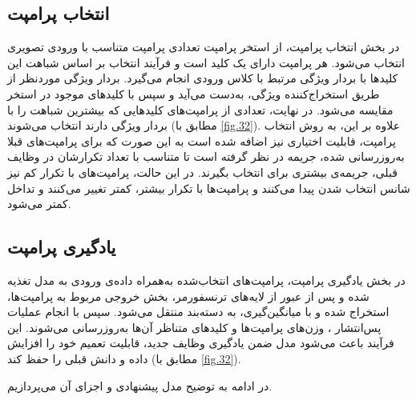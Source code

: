 \subsection{انتخاب پرامپت}
در بخش انتخاب پرامپت، از استخر پرامپت تعدادی پرامپت متناسب با ورودی تصویری انتخاب می‌شود. هر پرامپت دارای یک کلید است و فرآیند انتخاب بر اساس شباهت این کلیدها با بردار ویژگی مرتبط با کلاس ورودی انجام می‌گیرد. بردار ویژگی موردنظر از طریق استخراج‌کننده ویژگی، به‌دست می‌آید و سپس با کلیدهای موجود در استخر مقایسه می‌شود. در نهایت، تعدادی از پرامپت‌های کلیدهایی که بیشترین شباهت را با بردار ویژگی دارند انتخاب می‌شوند (مطابق با \cref{fig.32}). علاوه بر این، به روش انتخاب پرامپت، قابلیت اختیاری نیز اضافه شده است به این صورت که برای پرامپت‌های قبلا به‌روزرسانی شده، جریمه در نظر گرفته است تا متناسب با تعداد تکرارشان در وظایف قبلی، جریمه‌ی بیشتری برای انتخاب بگیرند. در این حالت، پرامپت‌های با تکرار کم نیز شانس انتخاب شدن پیدا می‌کنند و پرامپت‌ها با تکرار بیشتر، کمتر تغییر می‌کنند و تداخل کمتر می‌شود.
\subsection{یادگیری پرامپت}
در بخش یادگیری پرامپت، پرامپت‌های انتخاب‌شده به‌همراه داده‌ی ورودی به مدل تغذیه شده و پس از عبور از لایه‌های ترنسفورمر، بخش خروجی مربوط به پرامپت‌ها، استخراج شده و با میانگین‌گیری، به دسته‌بند  منتقل می‌شود. سپس با انجام عملیات پس‌انتشار ، وزن‌های پرامپت‌ها و کلیدهای متناظر آن‌ها به‌روزرسانی می‌شوند. این فرآیند باعث می‌شود مدل ضمن یادگیری وظایف جدید، قابلیت تعمیم خود را افزایش داده و دانش قبلی را حفظ کند (مطابق با \cref{fig.32}).

در ادامه به توضیح مدل پیشنهادی و اجزای آن می‌پردازیم. 
